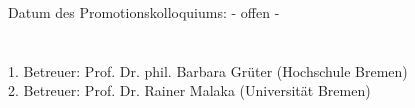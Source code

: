 

\begin{singlespace}
	\vspace*{160mm} Datum des Promotionskolloquiums: - offen - \\
	\\
	\\
	1. Betreuer: Prof. Dr. phil. Barbara Grüter (Hochschule Bremen)\\
	2. Betreuer: Prof. Dr. Rainer Malaka (Universität Bremen)\\
\end{singlespace}
